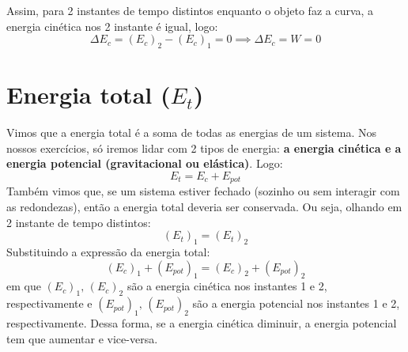 \documentclass[12pt]{extarticle}
\newcommand{\<}{\langle}
\renewcommand{\>}{\rangle}
\theoremstyle{definition}
\begin{document}
Assim, para 2 instantes de tempo distintos enquanto o objeto faz a curva, a energia cinética nos 2 instante é igual, logo:
\begin{equation}
    \Delta E_c = (E_c)_2 - (E_c)_1 = 0 \implies \boxed{\Delta E_c = W = 0}
\end{equation}

\section{Energia total ($E_t$)}
Vimos que a energia total é a soma de todas as energias de um sistema. Nos nossos exercícios, só iremos lidar com 2 tipos de energia: \textbf{a energia cinética e a energia potencial (gravitacional ou elástica)}. Logo:
\begin{equation}
    E_t = E_c + E_{pot}
\end{equation}
Também vimos que, se um sistema estiver fechado (sozinho ou sem interagir com as redondezas), então a energia total deveria ser conservada. Ou seja, olhando em 2 instante de tempo distintos:
\begin{equation}
    (E_t)_1 = (E_t)_2
\end{equation}
Substituindo a expressão da energia total:
\begin{equation}
    \boxed{(E_c)_1 + (E_{pot})_1 = (E_c)_2 + (E_{pot})_2}
\end{equation}
\noindent em que $(E_c)_1,\,(E_c)_2$ são a energia cinética nos instantes 1 e 2, respectivamente e $(E_{pot})_1,\,(E_{pot})_2$ são a energia potencial nos instantes 1 e 2, respectivamente. Dessa forma, se a energia cinética diminuir, a energia potencial tem que aumentar e vice-versa.
\end{document}
